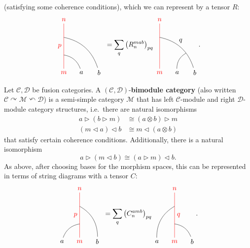 \begin{definition}
	(satisfying some coherence conditions), which we can represent by a tensor $R$:
		\begin{equation}
			\begin{tikzpicture}[scale=0.9,baseline=(current bounding box.center)]
			\node[red](m) at (0,0) {$m$};
			\node(b) at (1,0) {$a$};
			\node(a) at (2,0) {$b$};
			\node[red](abm) at (0,3) {$n$};
			\draw[red] (m) to node [left] {$p$} (abm);
			\draw (b) to [bend right] (0,1);
			\draw (a) to [bend right] (0,2);
			\end{tikzpicture}\ =\sum_q\left(R_n^{mab}\right)_{pq}
			\begin{tikzpicture}[scale=0.9,baseline=(current bounding box.center)]
			\node[red](m) at (0,0) {$m$};
			\node(b) at (1,0) {$a$};
			\node(a) at (2,0) {$b$};
			\node[red](abm) at (0,3) {$n$};
			\node(ab) at (1.2,1.8) {$q$};
			\draw[red] (m) to (abm);
			\draw (b) to [bend left] (1.5,1.1);
			\draw (a) to [bend right] (0,2);
			\end{tikzpicture}.
		\end{equation}
	
\begin{definition}
	Let $\mathcal{C}, \mathcal{D}$ be fusion categories. A $(\mathcal{C},\mathcal{D})$-\textbf{bimodule category} (also written $\mathcal{C}\curvearrowright\mathcal{M}\curvearrowleft\mathcal{D}$) is a semi-simple category $\mathcal{M}$ that has left $\mathcal{C}$-module and right $\mathcal{D}$-module category structures, i.e.\ there are natural isomorphisms 
		\begin{align}
			a\triangleright(b\triangleright m)&\cong(a\otimes b)\triangleright m\\ 
			(m\triangleleft a)\triangleleft b&\cong m\triangleleft(a\otimes b)
		\end{align}
	that satisfy certain coherence conditions. Additionally, there is a natural isomorphism 
		\begin{equation}
			a\triangleright(m\triangleleft b)\cong (a\triangleright m)\triangleleft b.
		\end{equation}
	As above, after choosing bases for the morphism spaces, this can be represented in terms of string diagrams with a tensor $C$:
		\begin{equation}
			\begin{tikzpicture}[scale=0.9,baseline=(current bounding box.center)]
			\node[red](m) at (0,0) {$m$};
			\node(a) at (-1,0) {$a$};
			\node(b) at (1,0) {$b$};
			\node[red](abm) at (0,3) {$n$};
			\draw[red] (m) to node [left] {$p$} (abm);
			\draw (a) to [bend left] (0,1);
			\draw (b) to [bend right] (0,2);
			\end{tikzpicture}\ =\sum_q\left(C_n^{amb}\right)_{pq}
			\begin{tikzpicture}[scale=0.9,baseline=(current bounding box.center)]
			\node[red](m) at (0,0) {$m$};
			\node(a) at (-1,0) {$a$};
			\node(b) at (1,0) {$b$};
			\node[red](abm) at (0,3) {$n$};
			\draw[red] (m) to node [right] {$q$} (abm);
			\draw (b) to [bend right] (0,1);
			\draw (a) to [bend left] (0,2);
			\end{tikzpicture}.
		\end{equation}
\end{definition}

\end{definition}